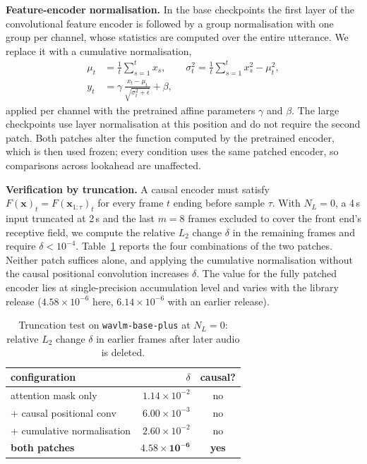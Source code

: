 \documentclass[journal]{IEEEtran}
\begin{document}
\textbf{Feature-encoder normalisation.} In the base checkpoints the first
layer of the convolutional feature encoder is followed by a group
normalisation with one group per channel, whose statistics are computed over
the entire utterance. We replace it with a cumulative normalisation,
\begin{equation}
\begin{aligned}
\mu_t &= \frac{1}{t}\sum_{s=1}^{t} x_s,\qquad
\sigma_t^2 = \frac{1}{t}\sum_{s=1}^{t} x_s^2 - \mu_t^2,\\
y_t &= \gamma\,\frac{x_t-\mu_t}{\sqrt{\sigma_t^2+\epsilon}} + \beta,
\end{aligned}
\label{eq:cumnorm}
\end{equation}
applied per channel with the pretrained affine parameters $\gamma$ and
$\beta$. The large checkpoints use layer normalisation at this position and do
not require the second patch. Both patches alter the function computed by the
pretrained encoder, which is then used frozen; every condition uses the same
patched encoder, so comparisons across lookahead are unaffected.

\textbf{Verification by truncation.} A causal encoder must satisfy
$F(\mathbf{x})_t = F(\mathbf{x}_{1:\tau})_t$ for every frame $t$ ending before
sample $\tau$. With $N_L=0$, a 4\,s input truncated at 2\,s and the last
$m=8$ frames excluded to cover the front end's receptive field, we compute the
relative $L_2$ change $\delta$ in the remaining frames and require
$\delta<10^{-4}$. Table~\ref{tab:causal} reports the four combinations of the
two patches. Neither patch suffices alone, and applying the cumulative
normalisation without the causal positional convolution increases $\delta$.
The value for the fully patched encoder lies at single-precision accumulation
level and varies with the library release ($4.58\times10^{-6}$ here,
$6.14\times10^{-6}$ with an earlier release).

\begin{table}[t]
\centering\footnotesize
\setlength{\tabcolsep}{4pt}
\renewcommand{\arraystretch}{0.93}
\caption{Truncation test on \texttt{wavlm-base-plus} at $N_L=0$: relative
$L_2$ change $\delta$ in earlier frames after later audio is deleted.}
\label{tab:causal}
\begin{tabular}{lrc}
\toprule
configuration & $\delta$ & causal? \\
\midrule
attention mask only        & $1.14\times10^{-2}$ & no \\
\quad + causal positional conv & $6.00\times10^{-3}$ & no \\
\quad + cumulative normalisation & $2.60\times10^{-2}$ & no \\
\textbf{both patches}      & $\mathbf{4.58\times10^{-6}}$ & \textbf{yes} \\
\bottomrule
\end{tabular}
\end{table}
\end{document}
